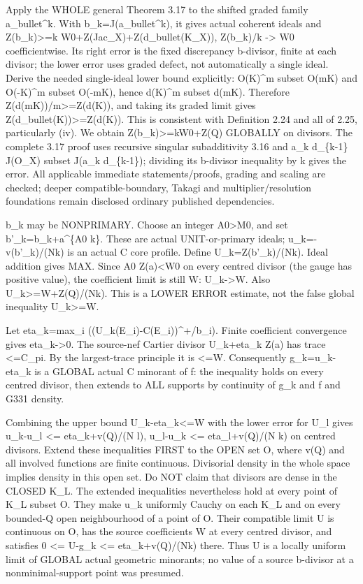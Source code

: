 \documentclass[11pt]{article}
\begin{document}
Apply the WHOLE general Theorem 3.17 to the shifted graded family a\_bullet\textasciicircum{}k. With b\_k=J(a\_bullet\textasciicircum{}k), it gives actual coherent ideals and
 Z(b\_k)>=k W0+Z(Jac\_X)+Z(d\_bullet(K\_X)),
 Z(b\_k)/k -> W0 coefficientwise.
Its right error is the fixed discrepancy b-divisor, finite at each divisor; the lower error uses graded defect, not automatically a single ideal. Derive the needed single-ideal lower bound explicitly: O(K)\textasciicircum{}m subset O(mK) and O(-K)\textasciicircum{}m subset O(-mK), hence d(K)\textasciicircum{}m subset d(mK). Therefore Z(d(mK))/m>=Z(d(K)), and taking its graded limit gives Z(d\_bullet(K))>=Z(d(K)). This is consistent with Definition 2.24 and all of 2.25, particularly (iv). We obtain Z(b\_k)>=kW0+Z(Q) GLOBALLY on divisors. The complete 3.17 proof uses recursive singular subadditivity 3.16 and a\_k d\_\{k-1\} J(O\_X) subset J(a\_k d\_\{k-1\}); dividing its b-divisor inequality by k gives the error. All applicable immediate statements/proofs, grading and scaling are checked; deeper compatible-boundary, Takagi and multiplier/resolution foundations remain disclosed ordinary published dependencies.

b\_k may be NONPRIMARY. Choose an integer A0>M0, and set b'\_k=b\_k+a\textasciicircum{}\{A0 k\}. These are actual UNIT-or-primary ideals; u\_k=-v(b'\_k)/(Nk) is an actual C core profile. Define U\_k=Z(b'\_k)/(Nk). Ideal addition gives MAX. Since A0 Z(a)<W0 on every centred divisor (the gauge has positive value), the coefficient limit is still W: U\_k->W. Also U\_k>=W+Z(Q)/(Nk). This is a LOWER ERROR estimate, not the false global inequality U\_k>=W.

Let eta\_k=max\_i ((U\_k(E\_i)-C(E\_i))\textasciicircum{}+/b\_i). Finite coefficient convergence gives eta\_k->0. The source-nef Cartier divisor U\_k+eta\_k Z(a) has trace <=C\_pi. By the largest-trace principle it is <=W. Consequently g\_k=u\_k-eta\_k is a GLOBAL actual C minorant of f: the inequality holds on every centred divisor, then extends to ALL supports by continuity of g\_k and f and G331 density.

Combining the upper bound U\_k-eta\_k<=W with the lower error for U\_l gives
 u\_k-u\_l <= eta\_k+v(Q)/(N l),
 u\_l-u\_k <= eta\_l+v(Q)/(N k)
on centred divisors. Extend these inequalities FIRST to the OPEN set O, where v(Q) and all involved functions are finite continuous. Divisorial density in the whole space implies density in this open set. Do NOT claim that divisors are dense in the CLOSED K\_L. The extended inequalities nevertheless hold at every point of K\_L subset O. They make u\_k uniformly Cauchy on each K\_L and on every bounded-Q open neighbourhood of a point of O. Their compatible limit U is continuous on O, has the source coefficients W at every centred divisor, and satisfies
 0 <= U-g\_k <= eta\_k+v(Q)/(Nk)
there. Thus U is a locally uniform limit of GLOBAL actual geometric minorants; no value of a source b-divisor at a nonminimal-support point was presumed.
\end{document}
